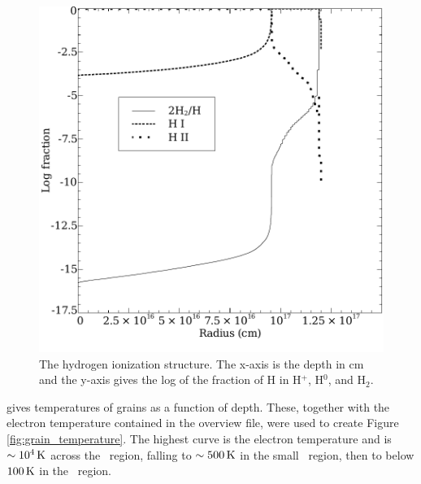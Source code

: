\documentclass[12pt,twoside]{article}
\begin{document}
{\begin{figure}
\begin{center}
\includegraphics[clip=on,width=0.8\columnwidth,height=0.8\textheight,keepaspectratio]{hydrogen_structure}
\end{center}
\caption{The hydrogen ionization structure.
The x-axis is the depth in cm and the
y-axis gives the log of the fraction of H in H$^+$, H$^0$, and H$_2$.}
\label{fig:hydrogen_structure}
\end{figure}

  gives
temperatures of grains as a function of
depth.
These, together with the electron temperature contained in the
overview file, were used to create Figure \ref{fig:grain_temperature}.
The highest curve
is the electron temperature and is $\sim 10^4 {\rm\thinspace K}$
across the \hplus\ region, falling
to $\sim 500 {\rm\thinspace K}$ in the small \hO\ region,
then to below $100 {\rm\thinspace K}$ in the \htwo\ region.

}
\end{document}
